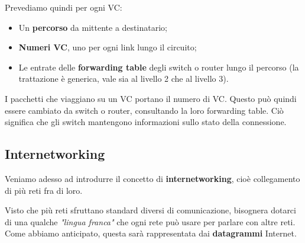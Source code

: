 \documentclass[a4paper,11pt]{article}
\begin{document}
\begin{itemize}
		Prevediamo quindi per ogni VC:
		\begin{itemize}
			\item Un \textbf{percorso} da mittente a destinatario;
			\item \textbf{Numeri VC}, uno per ogni link lungo il circuito;
			\item Le entrate delle \textbf{forwarding table} degli switch o router lungo il percorso (la trattazione è generica, vale sia al livello 2 che al livello 3).
		\end{itemize}

		I pacchetti che viaggiano su un VC portano il numero di VC. Questo può quindi essere cambiato da switch o router, consultando la loro forwarding table. Ciò significa che gli switch mantengono informazioni sullo stato della connessione. 
\end{itemize}

\subsection{Internetworking}
Veniamo adesso ad introdurre il concetto di \textbf{internetworking}, cioè collegamento di più reti fra di loro.

Visto che più reti sfruttano standard diversi di comunicazione, bisognera dotarci di una qualche \textit{"lingua franca"} che ogni rete può usare per parlare con altre reti. Come abbiamo anticipato, questa sarà rappresentata dai \textbf{datagrammi} Internet.
\end{document}
